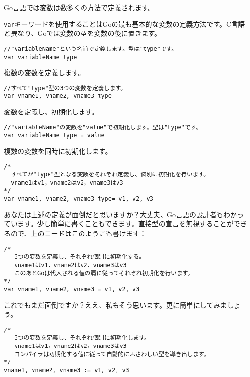 Go言語では変数は数多くの方法で定義されます。

\texttt{var}キーワードを使用することはGoの最も基本的な変数の定義方法です。C言語と異なり、Goでは変数の型を変数の後に置きます。


\begin{lstlisting}[numbers=none]
//"variableName"という名前で定義します。型は"type"です。
var variableName type
\end{lstlisting}

複数の変数を定義します。

\begin{lstlisting}[numbers=none]
//すべて"type"型の3つの変数を定義します。
var vname1, vname2, vname3 type
\end{lstlisting}

変数を定義し、初期化します。

\begin{lstlisting}[numbers=none]
//"variableName"の変数を"value"で初期化します。型は"type"です。
var variableName type = value
\end{lstlisting}

複数の変数を同時に初期化します。

\begin{lstlisting}[numbers=none]
/*
  すべてが"type"型となる変数をそれぞれ定義し、個別に初期化を行います。
  vname1はv1，vname2はv2，vname3はv3
*/
var vname1, vname2, vname3 type= v1, v2, v3
\end{lstlisting}

あなたは上述の定義が面倒だと思いますか？大丈夫、Go言語の設計者もわかっています。少し簡単に書くこともできます。直接型の宣言を無視することができるので、上のコードはこのようにも書けます：

\begin{lstlisting}[numbers=none]
/*
   3つの変数を定義し、それぞれ個別に初期化する。
   vname1はv1，vname2はv2，vname3はv3
   このあとGoは代入される値の肩に従ってそれぞれ初期化を行います。
*/
var vname1, vname2, vname3 = v1, v2, v3
\end{lstlisting}

これでもまだ面倒ですか？ええ、私もそう思います。更に簡単にしてみましょう。

\begin{lstlisting}[numbers=none]
/*
   3つの変数を定義し、それぞれ個別に初期化します。
   vname1はv1，vname2はv2，vname3はv3
   コンパイラは初期化する値に従って自動的にふさわしい型を導き出します。
*/
vname1, vname2, vname3 := v1, v2, v3
\end{lstlisting}

